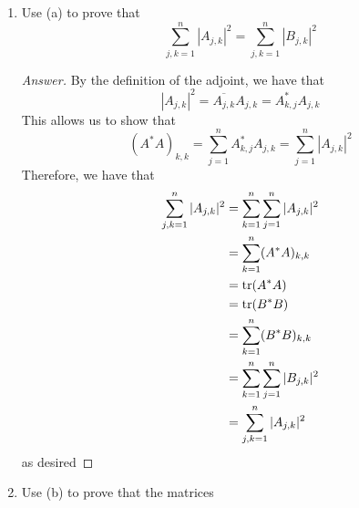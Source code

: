 \documentclass[../psets.tex]{subfiles}
\begin{document}
\begin{enumerate}[label={\textbf{6.\arabic*.}}]
\begin{enumerate}
        \begin{proof}[Answer]
            Let $A=UBU^*$. Then
            \begin{align*}
                \trace(A^*A) &= \trace((UBU^*)^*(UBU^*))\\
                &= \trace((U^*)^*B^*U^*UBU^*)\\
                &= \trace(UB^*IBU^*)\\
                &= \trace(B^*BUU^*)\\
                &= \trace(B^*BI)\\
                &= \trace(B^*B)
            \end{align*}
            as desired.
        \end{proof}
        \item Use (a) to prove that
        \begin{equation*}
            \sum_{j,k=1}^n|A_{j,k}|^2 = \sum_{j,k=1}^n|B_{j,k}|^2
        \end{equation*}
        \begin{proof}[Answer]
            By the definition of the adjoint, we have that
            \begin{equation*}
                |A_{j,k}|^2 = \overline{A_{j,k}}A_{j,k} = A^*_{k,j}A_{j,k}
            \end{equation*}
            This allows us to show that
            \begin{equation*}
                (A^*A)_{k,k} = \sum_{j=1}^nA^*_{k,j}A_{j,k} = \sum_{j=1}^n|A_{j,k}|^2
            \end{equation*}
            Therefore, we have that
            \begin{align*}
                \sum_{j,k=1}^n|A_{j,k}|^2 &= \sum_{k=1}^n\sum_{j=1}^n|A_{j,k}|^2\\
                &= \sum_{k=1}^n(A^*A)_{k,k}\\
                &= \trace(A^*A)\\
                &= \trace(B^*B)\\
                &= \sum_{k=1}^n(B^*B)_{k,k}\\
                &= \sum_{k=1}^n\sum_{j=1}^n|B_{j,k}|^2\\
                &= \sum_{j,k=1}^n|A_{j,k}|^2
            \end{align*}
            as desired
        \end{proof}
        \item Use (b) to prove that the matrices
        \begin{align*}

\end{align*}
\end{enumerate}
\end{enumerate}
\end{document}
